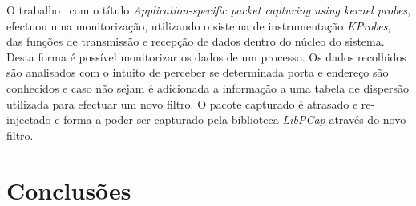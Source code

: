 \documentclass[a4paper]{llncs}
\begin{document}
O trabalho~\cite{1688981} com o título \textit{Application-specific packet capturing using kernel probes}, efectuou uma monitorização, utilizando o sistema de instrumentação \textit{KProbes}, das funções de transmissão e recepção de dados dentro do núcleo do sistema. Desta forma é possível monitorizar os dados de um processo. Os dados recolhidos são analisados com o intuito de perceber se determinada porta e endereço são conhecidos e caso não sejam é adicionada a informação a uma tabela de dispersão utilizada para efectuar um novo filtro. O pacote capturado  é atrasado e re-injectado e forma a poder ser capturado pela biblioteca \textit{LibPCap} através do novo filtro.

\section{Conclusões}
\label{sec:conclusions}




\end{document}
